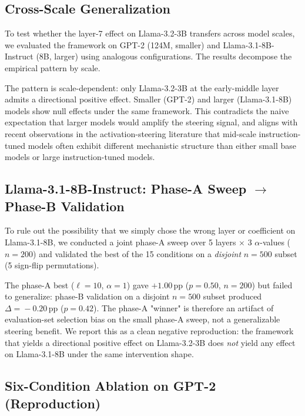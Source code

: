\documentclass[conference]{IEEEtran}
\begin{document}
\subsection{Cross-Scale Generalization}\label{sec:results-cross-scale}

To test whether the layer-7 effect on Llama-3.2-3B transfers across model scales, we evaluated the framework on GPT-2 (124M, smaller) and Llama-3.1-8B-Instruct (8B, larger) using analogous configurations. The results decompose the empirical pattern by scale.



The pattern is scale-dependent: only Llama-3.2-3B at the early-middle layer admits a directional positive effect. Smaller (GPT-2) and larger (Llama-3.1-8B) models show null effects under the same framework. This contradicts the naive expectation that larger models would amplify the steering signal, and aligns with recent observations in the activation-steering literature that mid-scale instruction-tuned models often exhibit different mechanistic structure than either small base models or large instruction-tuned models.

\subsection{Llama-3.1-8B-Instruct: Phase-A Sweep $\to$ Phase-B Validation}\label{sec:results-llama8b}

To rule out the possibility that we simply chose the wrong layer or coefficient on Llama-3.1-8B, we conducted a joint phase-A sweep over 5 layers $\times$ 3 $\alpha$-values ($n\!=\!200$) and validated the best of the 15 conditions on a \emph{disjoint} $n\!=\!500$ subset (5 sign-flip permutations).



The phase-A best ($\ell\!=\!10$, $\alpha\!=\!1$) gave $+1.00$\,pp ($p\!=\!0.50$, $n\!=\!200$) but failed to generalize: phase-B validation on a disjoint $n\!=\!500$ subset produced $\Delta\!=\!-0.20$\,pp ($p\!=\!0.42$). The phase-A "winner" is therefore an artifact of evaluation-set selection bias on the small phase-A sweep, not a generalizable steering benefit. We report this as a clean negative reproduction: the framework that yields a directional positive effect on Llama-3.2-3B does \emph{not} yield any effect on Llama-3.1-8B under the same intervention shape.

\subsection{Six-Condition Ablation on GPT-2 (Reproduction)}\label{sec:results-ablation}
\end{document}
